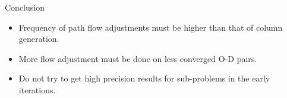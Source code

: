 \documentclass{beamer}
\begin{document}
\begin{frame}{Conclusion}
\begin{itemize}
    \item Frequency of path flow adjustments must be higher
    than that of column generation.

    \item More flow adjustment must be done on less converged
    O-D pairs.

    \item Do not try to get high precision results for
    sub-problems in the early iterations.
\end{itemize}
\end{frame}
\end{document}
